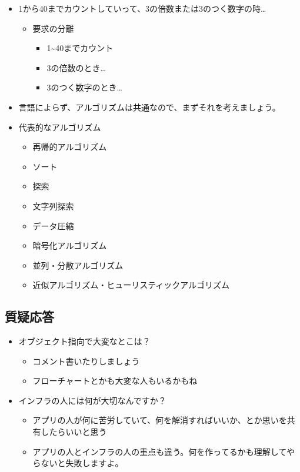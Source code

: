 \documentclass{jsarticle}
\begin{document}
\begin{itemize}
\item
  1から40までカウントしていって、3の倍数または3のつく数字の時\ldots{}
  \begin{itemize}
  \item
    要求の分離
    \begin{itemize}
    \item
      1\textasciitilde{}40までカウント
    \item
      3の倍数のとき\ldots{}
    \item
      3のつく数字のとき\ldots{}
    \end{itemize}
  \end{itemize}
\item
  言語によらず、アルゴリズムは共通なので、まずそれを考えましょう。
\item
  代表的なアルゴリズム
  \begin{itemize}
  \item
    再帰的アルゴリズム
  \item
    ソート
  \item
    探索
  \item
    文字列探索
  \item
    データ圧縮
  \item
    暗号化アルゴリズム
  \item
    並列・分散アルゴリズム
  \item
    近似アルゴリズム・ヒューリスティックアルゴリズム
  \end{itemize}
\end{itemize}
\subsection{質疑応答}

\begin{itemize}
\item
  オブジェクト指向で大変なとこは？
  \begin{itemize}
  \item
    コメント書いたりしましょう
  \item
    フローチャートとかも大変な人もいるかもね
  \end{itemize}
\item
  インフラの人には何が大切なんですか？
  \begin{itemize}
  \item
    アプリの人が何に苦労していて、何を解消すればいいか、とか思いを共有したらいいと思う
  \item
    アプリの人とインフラの人の重点も違う。何を作ってるかも理解してやらないと失敗しますよ。
  \end{itemize}
\end{itemize}
\end{document}
